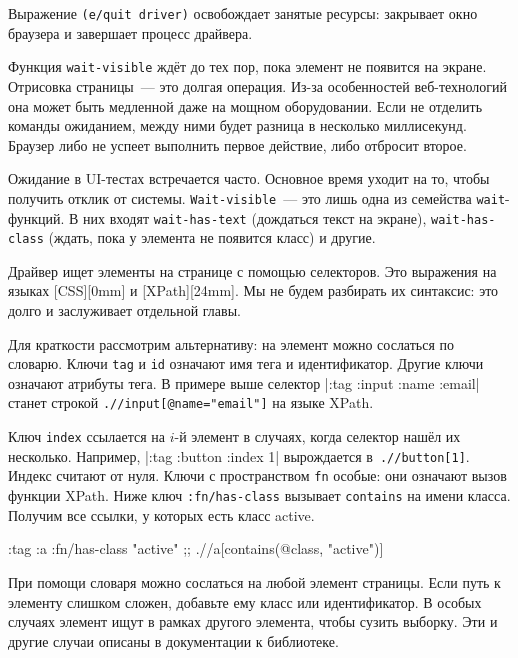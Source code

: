 Выражение \verb|(e/quit driver)| освобождает занятые ресурсы: закрывает окно
браузера и завершает процесс драйвера.

Функция \verb|wait-visible| ждёт до тех пор, пока элемент не появится на
экране. Отрисовка страницы~--- это долгая операция. Из-за особенностей
веб-технологий она может быть медленной даже на мощном оборудовании. Если не
отделить команды ожиданием, между ними будет разница в несколько
миллисекунд. Браузер либо не успеет выполнить первое действие, либо отбросит
второе.

Ожидание в UI-тестах встречается часто. Основное время уходит на то, чтобы
получить отклик от системы. \verb|Wait-visible|~--- это лишь одна из семейства
\verb|wait|-функций. В них входят \texttt{wait\--has\--text} (дождаться текст на
экране), \verb|wait-has-class| (ждать, пока у элемента не появится класс) и
другие.


Драйвер ищет элементы на странице с помощью селекторов. Это выражения на языках
[CSS][0mm] и
[XPath][24mm]. Мы
не будем разбирать их синтаксис: это долго и заслуживает отдельной главы.

Для краткости рассмотрим альтернативу: на элемент можно сослаться по
словарю. Ключи \verb|tag| и \verb|id| означают имя тега и идентификатор. Другие
ключи означают атрибуты тега. В примере выше селектор
\spverb|{:tag :input :name :email}| станет строкой
\verb|.//input[@name="email"]| на языке XPath.


Ключ \verb|index| ссылается на $i$-й элемент в случаях, когда селектор нашёл их
несколько. Например, \spverb|{:tag :button :index 1}| вырождается
в~\verb|.//button[1]|. Индекс считают от нуля. Ключи с пространством \verb|fn|
особые: они означают вызов функции XPath. Ниже ключ \verb|:fn/has-class|
вызывает \verb|contains| на имени класса. Получим все ссылки, у которых есть
класс active.

\begin{english}
  \begin{clojure}
{:tag :a :fn/has-class "active"}
;; .//a[contains(@class, "active")]
  \end{clojure}
\end{english}

При помощи словаря можно сослаться на любой элемент страницы. Если путь к
элементу слишком сложен, добавьте ему класс или идентификатор. В особых случаях
элемент ищут в рамках другого элемента, чтобы сузить выборку. Эти и другие
случаи описаны в документации к библиотеке.


